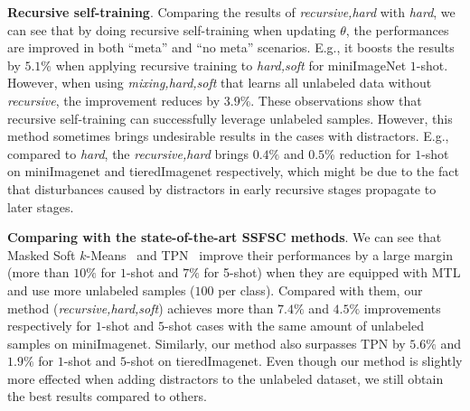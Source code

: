 \documentclass{article}
\newcommand{\myparagraph}[1]{\vspace{0.1em}\noindent\textbf{#1}}
\begin{document}
\myparagraph{Recursive self-training}. Comparing the results of \emph{recursive,hard} with \emph{hard}, we can see that by doing recursive self-training when updating $\theta$, the performances are improved in both ``meta'' and ``no meta'' scenarios. E.g., it boosts the results by $5.1\%$ when applying recursive training to \emph{hard,soft} for miniImageNet $1$-shot. 
However, when using \emph{mixing,hard,soft} that learns all unlabeled data without \emph{recursive}, the improvement reduces by $3.9\%$.
These observations show that recursive self-training can successfully leverage unlabeled samples. 
However, this method sometimes brings undesirable results in the cases with distractors. E.g., compared to \emph{hard}, the \emph{recursive,hard} brings $0.4\%$ and $0.5\%$ reduction for $1$-shot on miniImagenet and tieredImagenet respectively, which might be due to the fact that disturbances caused by distractors in early recursive stages propagate to later stages. 

\myparagraph{Comparing with the state-of-the-art SSFSC methods}. We can see that Masked Soft $k$-Means~\cite{RenICLR2018_semisupervised} and TPN~\cite{LiuICLR2019transductive} improve their performances by a large margin (more than $10\%$ for $1$-shot and $7\%$ for 5-shot) when they are equipped with MTL and use more unlabeled samples ($100$ per class). Compared with them, our method (\emph{recursive,hard,soft}) achieves more than $7.4\%$ and $4.5\%$ improvements respectively for $1$-shot and $5$-shot cases with the same amount of unlabeled samples on miniImagenet. Similarly, our method also surpasses TPN by $5.6\%$ and $1.9\%$ for $1$-shot and $5$-shot on tieredImagenet. 
Even though our method is slightly more effected when adding distractors to the unlabeled dataset, we still obtain the best results compared to others.
\end{document}

